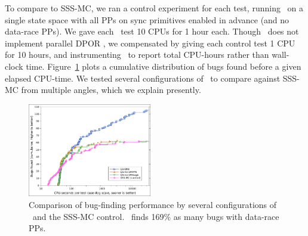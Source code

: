 To compare to SSS-MC, we ran a control experiment for each test, running \landslide~on a single state space with all PPs on sync primitives enabled in advance (and no data-race PPs).
We gave each \quicksand~test 10 CPUs for 1 hour each. %
Though \landslide~does not implement parallel DPOR \cite{parallel-dpor}, we compensated by giving each control test 1 CPU for 10 hours,
and instrumenting \quicksand~to report total CPU-hours rather than wall-clock time.
Figure~\ref{fig:dowefindbugsfaster} plots a cumulative distribution of bugs found before a given elapsed CPU-time. %
We tested several configurations of \quicksand~to compare against SSS-MC from multiple angles,
which we explain presently.

\begin{figure}[t]
	\includegraphics[width=0.48\textwidth]{dowefindbugsfaster.pdf}
	\caption{Comparison of bug-finding performance
	by several configurations of \quicksand~and the SSS-MC control.
	\quicksand~finds 169\% as many bugs with data-race PPs.}
	\label{fig:dowefindbugsfaster}
\end{figure}

